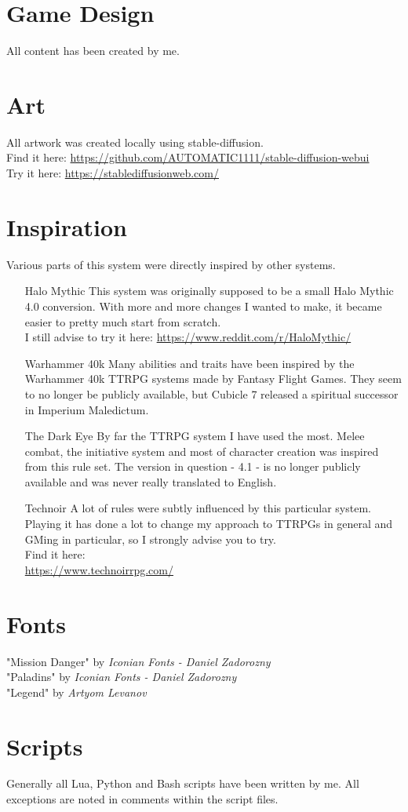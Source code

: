\section*{Game Design}
All content has been created by me.

\section*{Art}
All artwork was created locally using stable-diffusion.\\
Find it here: \url{https://github.com/AUTOMATIC1111/stable-diffusion-webui}\\
Try it here: \url{https://stablediffusionweb.com/}

\section*{Inspiration}
Various parts of this system were directly inspired by other systems.
\begin{enumerate}
	\item[Halo Mythic] This system was originally supposed to be a small Halo Mythic 4.0 conversion. With more and more changes I wanted to make, it became easier to pretty much start from scratch.\\
		I still advise to try it here: \url{https://www.reddit.com/r/HaloMythic/}
	\item[Warhammer 40k] Many abilities and traits have been inspired by the Warhammer 40k TTRPG systems made by Fantasy Flight Games. They seem to no longer be publicly available, but Cubicle 7 released a spiritual successor in Imperium Maledictum.
	\item[The Dark Eye] By far the TTRPG system I have used the most. Melee combat, the initiative system and most of character creation was inspired from this rule set. The version in question - 4.1 - is no longer publicly available and was never really translated to English.
	\item[Technoir] A lot of rules were subtly influenced by this particular system. Playing it has done a lot to change my approach to TTRPGs in general and GMing in particular, so I strongly advise you to try.\\
		Find it here:\\ \url{https://www.technoirrpg.com/}
\end{enumerate}

\section*{Fonts}
"Mission Danger" by \textit{Iconian Fonts - Daniel Zadorozny}\\
"Paladins" by \textit{Iconian Fonts - Daniel Zadorozny}\\
"Legend" by \textit{Artyom Levanov}

\section*{Scripts}
Generally all Lua, Python and Bash scripts have been written by me. All exceptions are noted in comments within the script files.